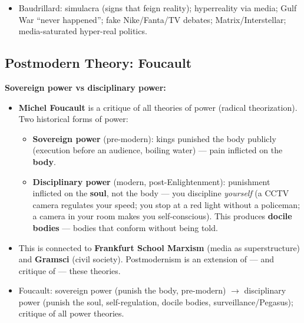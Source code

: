 \begin{QuickRevision}
\begin{itemize}
\item Baudrillard: simulacra (signs that feign reality); hyperreality via media; Gulf War ``never happened''; fake Nike/Fanta/TV debates; Matrix/Interstellar; media-saturated hyper-real politics.
\end{itemize}
\end{QuickRevision}

\sectiondivider

\subsection{Postmodern Theory: Foucault}

\begin{KeyConcept}
\textbf{Sovereign power vs disciplinary power:}
\begin{itemize}
\item \textbf{Michel Foucault} is a critique of all theories of power (radical theorization). Two historical forms of power:
\begin{itemize}
\item \textbf{Sovereign power} (pre-modern): kings punished the body publicly (execution before an audience, boiling water) --- pain inflicted on the \textbf{body}.
\item \textbf{Disciplinary power} (modern, post-Enlightenment): punishment inflicted on the \textbf{soul}, not the body --- you discipline \textit{yourself} (a CCTV camera regulates your speed; you stop at a red light without a policeman; a camera in your room makes you self-conscious). This produces \textbf{docile bodies} --- bodies that conform without being told.
\end{itemize}
\item This is connected to \textbf{Frankfurt School Marxism} (media as superstructure) and \textbf{Gramsci} (civil society). Postmodernism is an extension of --- and critique of --- these theories.
\end{itemize}
\end{KeyConcept}

\begin{QuickRevision}
\begin{itemize}
\item Foucault: sovereign power (punish the body, pre-modern) $\rightarrow$ disciplinary power (punish the soul, self-regulation, docile bodies, surveillance/Pegasus); critique of all power theories.
\end{itemize}
\end{QuickRevision}